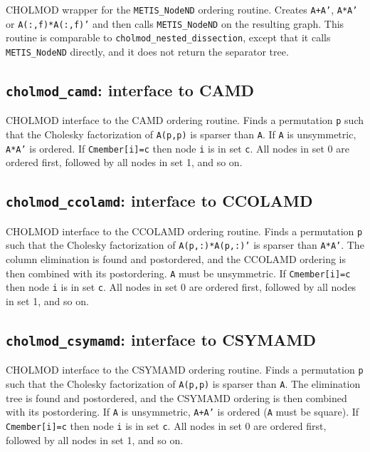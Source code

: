 \documentclass[11pt]{article}
\begin{document}

CHOLMOD wrapper for the {\tt METIS\_NodeND} ordering routine.  Creates {\tt A+A'},
{\tt A*A'} or {\tt A(:,f)*A(:,f)'} and then calls {\tt METIS\_NodeND} on the resulting graph.
This routine is comparable to {\tt cholmod\_nested\_dissection}, except that it
calls {\tt METIS\_NodeND} directly, and it does not return the separator tree.

\newpage \subsection{{\tt cholmod\_camd}: interface to CAMD}


CHOLMOD interface to the CAMD ordering routine.  Finds a permutation
{\tt p} such that the Cholesky factorization of {\tt A(p,p)}
is sparser than {\tt A}.  If {\tt A} is unsymmetric,
{\tt A*A'} is ordered.
If {\tt Cmember[i]=c} then node {\tt i} is in set {\tt c}.
All nodes in set 0 are ordered first, followed by all nodes in set 1, and so on.

\newpage \subsection{{\tt cholmod\_ccolamd}: interface to CCOLAMD}


CHOLMOD interface to the CCOLAMD ordering routine.  Finds a permutation
{\tt p} such that the Cholesky factorization of {\tt A(p,:)*A(p,:)'} is sparser than {\tt A*A'}.
The column elimination is found and postordered, and the CCOLAMD ordering is then
combined with its postordering.  {\tt A} must be unsymmetric.
If {\tt Cmember[i]=c} then node {\tt i} is in set {\tt c}.
All nodes in set 0 are ordered first, followed by all nodes in set 1, and so on.

\subsection{{\tt cholmod\_csymamd}: interface to CSYMAMD}


CHOLMOD interface to the CSYMAMD ordering routine.  Finds a permutation
{\tt p} such that the Cholesky factorization of {\tt A(p,p)} is sparser than {\tt A}.
The elimination tree is found and postordered, and the CSYMAMD
ordering is then combined with its postordering.  If {\tt A} is unsymmetric,
{\tt A+A'} is ordered ({\tt A} must be square).
If {\tt Cmember[i]=c} then node {\tt i} is in set {\tt c}.
All nodes in set 0 are ordered first, followed by all nodes in set 1, and so on.
\end{document}
